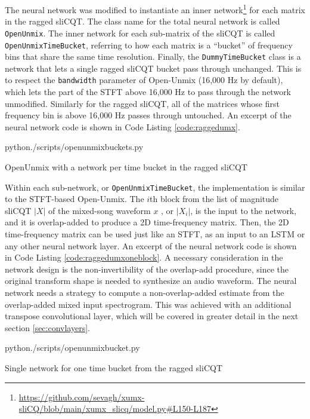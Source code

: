 \documentclass[report.tex]{subfiles}
\begin{document}
The neural network was modified to instantiate an inner network\footnote{\url{https://github.com/sevagh/xumx-sliCQ/blob/main/xumx_slicq/model.py\#L150-L187}} for each matrix in the ragged sliCQT. The class name for the total neural network is called \Verb#OpenUnmix#. The inner network for each sub-matrix of the sliCQT is called \Verb#OpenUnmixTimeBucket#, referring to how each matrix is a ``bucket'' of frequency bins that share the same time resolution. Finally, the \Verb#DummyTimeBucket# class is a network that lets a single ragged sliCQT bucket pass through unchanged. This is to respect the \Verb#bandwidth# parameter of Open-Unmix (16,000 Hz by default), which lets the part of the STFT above 16,000 Hz to pass through the network unmodified. Similarly for the ragged sliCQT, all of the matrices whose first frequency bin is above 16,000 Hz passes through untouched. An excerpt of the neural network code is shown in Code Listing \ref{code:raggedumx}.

\begin{listing}[ht]
  \centering
\begin{inputminted}[linenos,breaklines,frame=single,fontsize=\scriptsize]{python}{./scripts/openunmixbuckets.py}
\end{inputminted}
  \caption{OpenUnmix with a network per time bucket in the ragged sliCQT}
  \label{code:raggedumx}
\end{listing}

Within each sub-network, or \Verb#OpenUnmixTimeBucket#, the implementation is similar to the STFT-based Open-Unmix. The $i$th block from the list of magnitude sliCQT $|X|$ of the mixed-song waveform $x$ , or $|X_{i}|$, is the input to the network, and it is overlap-added to produce a 2D time-frequency matrix. Then, the 2D time-frequency matrix can be used just like an STFT, as an input to an LSTM or any other neural network layer. An excerpt of the neural network code is shown in Code Listing \ref{code:raggedumxoneblock}.  A necessary consideration in the network design is the non-invertibility of the overlap-add procedure, since the original transform shape is needed to synthesize an audio waveform. The neural network needs a strategy to compute a non-overlap-added estimate from the overlap-added mixed input spectrogram. This was achieved with an additional transpose convolutional layer, which will be covered in greater detail in the next section \ref{sec:convlayers}.

\begin{listing}[ht]
  \centering
\begin{inputminted}[linenos,breaklines,frame=single,fontsize=\scriptsize]{python}{./scripts/openunmixbucket.py}
\end{inputminted}
  \caption{Single network for one time bucket from the ragged sliCQT}
  \label{code:raggedumxoneblock}
\end{listing}
\end{document}
